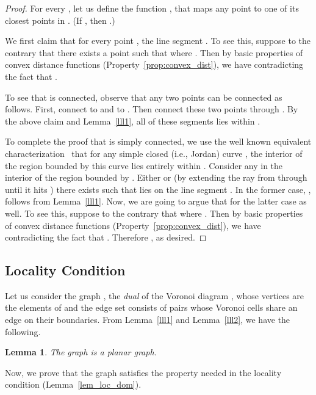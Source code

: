\documentclass[a4paper,11pt]{article}
\newtheorem{lemma}{Lemma}
\begin{document}
\begin{proof}
For every , let us define the function , that maps any point to one of its closest points in . (If , then .) 


We first claim that for every point , the line segment . To see this, suppose to the contrary that there exists a point   such that  where . Then by basic
properties of convex distance functions (Property~\ref{prop:convex_dist}), we have
 contradicting the fact that . 


To see that  is connected, observe that any two points  can be connected as follows. 
First, connect  to  and  to . 
Then connect these two points through
. 
By the above claim and Lemma~\ref{lll1}, all of these segments lies within .

To complete the proof that  is simply connected, we use the well known equivalent characterization~\cite{KleinW88} that for any simple closed (i.e., Jordan) curve , the interior of the region bounded by this curve lies entirely within . 
Consider any  in the interior of the region bounded by . 
Either  or (by extending the ray from  through  until it hits ) there exists  such that  lies on the line segment . In the former case, , follows from Lemma~\ref{lll1}. Now, we are going to argue that  for the latter case as well. To see this, suppose to the contrary that  where .
Then by basic
properties of convex distance functions (Property~\ref{prop:convex_dist}), we have
 contradicting the fact that . Therefore , as desired. 
\end{proof}


\subsection{Locality Condition}
\label{loc-cond}
 
Let us consider the graph  ,  the \emph{dual} of the Voronoi diagram , whose  
  vertices  are the elements of  and the edge set  consists of pairs  whose Voronoi cells share an edge on their boundaries.  
 From 
Lemma~\ref{lll1} and Lemma~\ref{lll2},  we have the following.

\begin{lemma}
 The graph   is a planar graph.
\end{lemma}
 
Now,  we prove that the graph  satisfies the property needed in the locality condition (Lemma~\ref{lem_loc_dom}).
\end{document}

